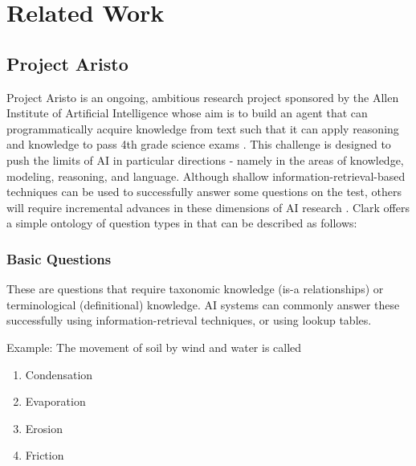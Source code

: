  
\chapter{Related Work}

\section{Project Aristo}

Project Aristo is an ongoing, ambitious research project sponsored by the Allen Institute of
Artificial Intelligence whose aim is to build an agent that can programmatically 
acquire knowledge from text such that it can apply reasoning and knowledge 
to pass 4th grade science exams \cite{clark2015elementary}.  This challenge is designed to push the limits of AI in particular directions - namely in the areas of knowledge, modeling, reasoning, and language.  Although shallow information-retrieval-based techniques can be used to successfully answer some questions on the test, others will require incremental advances in these dimensions of AI research \cite{clark2015elementary}.  Clark \cite{clark2015elementary} offers a simple ontology of question types in that can be described as follows:


\subsection{Basic Questions}

These are questions that require taxonomic knowledge (is-a relationships) or terminological (definitional) knowledge.  AI systems can commonly answer these successfully using information-retrieval techniques, or using lookup tables.  


Example: The movement of soil by wind and water is called \cite{clark2015elementary}

\begin{enumerate}[label=\Alph*.]
\item Condensation
\item Evaporation
\item Erosion
\item Friction
\end{enumerate}

